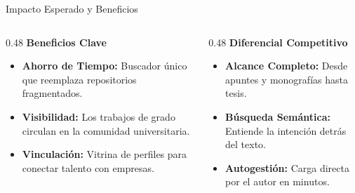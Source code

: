 \documentclass[11pt,aspectratio=169]{beamer}
\begin{document}
\begin{frame}{Impacto Esperado y Beneficios}
  \small
  \begin{columns}[T]
    \begin{column}{0.48\textwidth}
      {\headingfont\bfseries\color{brandlt}Beneficios Clave}\\[0.1cm]
      \begin{itemize}
        \item \textbf{Ahorro de Tiempo:} Buscador único que reemplaza repositorios fragmentados.
        \item \textbf{Visibilidad:} Los trabajos de grado circulan en la comunidad universitaria.
        \item \textbf{Vinculación:} Vitrina de perfiles para conectar talento con empresas.
      \end{itemize}
    \end{column}

    \begin{column}{0.48\textwidth}
      {\headingfont\bfseries\color{brandlt}Diferencial Competitivo}\\[0.1cm]
      \begin{itemize}
        \item \textbf{Alcance Completo:} Desde apuntes y monografías hasta tesis.
        \item \textbf{Búsqueda Semántica:} Entiende la intención detrás del texto.
        \item \textbf{Autogestión:} Carga directa por el autor en minutos.
      \end{itemize}
    \end{column}
  \end{columns}
\end{frame}
\end{document}
